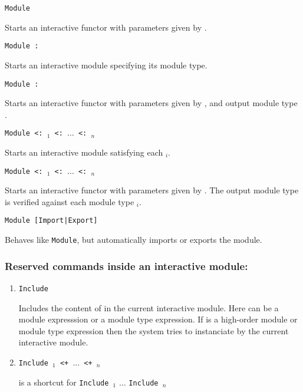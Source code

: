 \begin{Variants}

\item{\tt Module {\ident} {\modbindings}}

  Starts an interactive functor with parameters given by {\modbindings}.

\item{\tt Module {\ident} \verb.:. {\modtype}}

  Starts an interactive module specifying its module type. 

\item{\tt Module {\ident} {\modbindings} \verb.:. {\modtype}}

  Starts an interactive functor with parameters given by
  {\modbindings}, and output module type {\modtype}.

\item{\tt Module {\ident} \verb.<:. {\modtype$_1$} \verb.<:. $\ldots$ \verb.<:.{ \modtype$_n$}}

  Starts an interactive module satisfying each {\modtype$_i$}. 

\item{\tt Module {\ident} {\modbindings} \verb.<:. {\modtype$_1$} \verb.<:. $\ldots$ \verb.<:. {\modtype$_n$}}

  Starts an interactive functor with parameters given by
  {\modbindings}. The output module type is verified against each
  module type {\modtype$_i$}.

\item\texttt{Module [Import|Export]}

  Behaves like \texttt{Module}, but automatically imports or exports
  the module.

\end{Variants}
\subsubsection{Reserved commands inside an interactive module:
}
\begin{enumerate}
\item {\tt Include {\module}}

  Includes the content of {\module} in the current interactive
 module. Here {\module} can be a module expresssion or a module type
 expression. If {\module} is a high-order module or module type
 expression then the system tries to instanciate {\module}
 by the current interactive module.

\item {\tt Include {\module$_1$} \verb.<+. $\ldots$ \verb.<+. {\module$_n$}} 

is a shortcut for {\tt Include {\module$_1$}}  $\ldots$ {\tt Include {\module$_n$}}
\end{enumerate}
